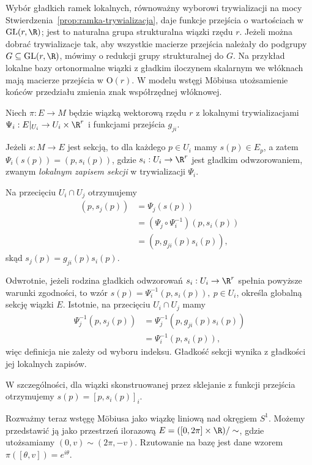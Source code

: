 \begin{uwaga}
Wybór gładkich ramek lokalnych, równoważny wyborowi trywializacji
na mocy Stwierdzenia~\ref{prop:ramka-trywializacja},
daje funkcje przejścia o wartościach w
$\mathrm{GL}(r,\R)$; jest to
naturalna grupa strukturalna wiązki rzędu $r$. Jeżeli można dobrać
trywializacje tak, aby wszystkie macierze przejścia należały do podgrupy
$G\subseteq\mathrm{GL}(r,\R)$, mówimy o redukcji grupy strukturalnej do $G$.
Na przykład lokalne bazy ortonormalne wiązki z gładkim iloczynem
skalarnym we włóknach mają macierze przejścia w $\mathrm{O}(r)$.
W modelu wstęgi Möbiusa utożsamienie końców przedziału
zmienia znak współrzędnej włóknowej.
\end{uwaga}


\begin{przyklad}
Niech $\pi:E\to M$ będzie wiązką wektorową rzędu $r$
z lokalnymi trywializacjami
$\Psi_i:E|_{U_i}\to U_i\times\R^r$ i funkcjami przejścia
$g_{ji}$.

Jeżeli $s:M\to E$ jest sekcją, to dla każdego $p\in U_i$
mamy $s(p)\in E_p$, a zatem $\Psi_i(s(p))=(p,s_i(p))$,
gdzie $s_i:U_i\to\R^r$ jest gładkim odwzorowaniem,
zwanym \emph{lokalnym zapisem sekcji} w trywializacji
$\Psi_i$.

Na przecięciu $U_i\cap U_j$ otrzymujemy
\[
\begin{aligned}
(p,s_j(p))
&=\Psi_j(s(p))\\
&=(\Psi_j\circ\Psi_i^{-1})(p,s_i(p))\\
&=(p,g_{ji}(p)s_i(p)),
\end{aligned}
\]
skąd $s_j(p)=g_{ji}(p)s_i(p)$.

Odwrotnie, jeżeli rodzina gładkich odwzorowań
$s_i:U_i\to\R^r$ spełnia powyższe warunki zgodności,
to wzór $s(p)=\Psi_i^{-1}(p,s_i(p)),\ p\in U_i$,
określa globalną sekcję wiązki $E$.
Istotnie, na przecięciu $U_i\cap U_j$ mamy
\[
\begin{aligned}
\Psi_j^{-1}(p,s_j(p))
&=\Psi_j^{-1}(p,g_{ji}(p)s_i(p))\\
&=\Psi_i^{-1}(p,s_i(p)),
\end{aligned}
\]
więc definicja nie zależy od wyboru indeksu.
Gładkość sekcji wynika z gładkości jej lokalnych
zapisów.

W szczególności, dla wiązki skonstruowanej przez
sklejanie z funkcji przejścia otrzymujemy $s(p)=[p,s_i(p)]_i$.

Rozważmy teraz wstęgę Möbiusa jako wiązkę liniową
nad okręgiem $S^1$. Możemy przedstawić ją jako
przestrzeń ilorazową $E=([0,2\pi]\times\R)/\sim$,
gdzie utożsamiamy $(0,v)\sim(2\pi,-v)$.
Rzutowanie na bazę jest dane wzorem $\pi([\theta,v])=e^{i\theta}$.


\end{przyklad}
